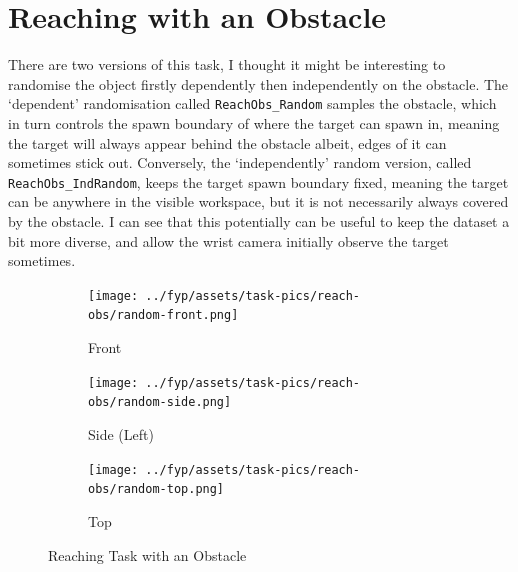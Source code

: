 \section{Reaching with an Obstacle}\label{sec:reach-obs}
There are two versions of this task, I thought it might be interesting to randomise the object firstly dependently then independently on the obstacle. The `dependent' randomisation called \verb|ReachObs_Random| samples the obstacle, which in turn controls the spawn boundary of where the target can spawn in, meaning the target will always appear behind the obstacle albeit, edges of it can sometimes stick out. Conversely, the `independently' random version, called \verb|ReachObs_IndRandom|, keeps the target spawn boundary fixed, meaning the target can be anywhere in the visible workspace, but it is not necessarily always covered by the obstacle. I can see that this potentially can be useful to keep the dataset a bit more diverse, and allow the wrist camera initially observe the target sometimes.

\begin{figure}[htpb] 
  \centering
  \begin{subfigure}{0.3\textwidth}
    \centering
    \texttt{[image: ../fyp/assets/task-pics/reach-obs/random-front.png]}
    \caption{Front}\label{fig:reach-obs-random-front}
  \end{subfigure}%

  \begin{subfigure}{0.3\textwidth}
    \centering
    \texttt{[image: ../fyp/assets/task-pics/reach-obs/random-side.png]}
    \caption{Side (Left)}\label{fig:reach-obs-random-side}
  \end{subfigure}%

  \begin{subfigure}{0.3\textwidth}
    \centering
    \texttt{[image: ../fyp/assets/task-pics/reach-obs/random-top.png]}
    \caption{Top}\label{fig:reach-obs-random}
  \end{subfigure}%
  \caption{Reaching Task with an Obstacle}\label{fig:reach-obs-random-left}
\end{figure}%

